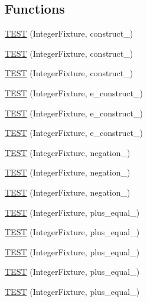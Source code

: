 \subsection*{Functions}
\begin{DoxyCompactItemize}
\item 
\hyperlink{TestInteger_8c_09_09_a675039150248bf0c32e91943652eec94}{T\-E\-S\-T} (Integer\-Fixture, construct\-\_)
\item 
\hyperlink{TestInteger_8c_09_09_ab7b0e23511a3a5075c5fec431d014f40}{T\-E\-S\-T} (Integer\-Fixture, construct\-\_)
\item 
\hyperlink{TestInteger_8c_09_09_afff7d1576c3f9ef137e9a6961ebf690d}{T\-E\-S\-T} (Integer\-Fixture, construct\-\_)
\item 
\hyperlink{TestInteger_8c_09_09_ae066e15674b0c4df3b5b42fcb8f58d06}{T\-E\-S\-T} (Integer\-Fixture, e\-\_\-construct\-\_)
\item 
\hyperlink{TestInteger_8c_09_09_af58d400c030da2027f3db5bfa4d8b690}{T\-E\-S\-T} (Integer\-Fixture, e\-\_\-construct\-\_)
\item 
\hyperlink{TestInteger_8c_09_09_a9ced8436f7a4feeb5305e47b8846e186}{T\-E\-S\-T} (Integer\-Fixture, e\-\_\-construct\-\_)
\item 
\hyperlink{TestInteger_8c_09_09_a87298984a3026a3e01b931e605af6921}{T\-E\-S\-T} (Integer\-Fixture, negation\-\_)
\item 
\hyperlink{TestInteger_8c_09_09_ae71d8b5fd38aaca8f6cbab68089c9ad4}{T\-E\-S\-T} (Integer\-Fixture, negation\-\_)
\item 
\hyperlink{TestInteger_8c_09_09_af175625da1bd939494ca4fd02e788bc1}{T\-E\-S\-T} (Integer\-Fixture, negation\-\_)
\item 
\hyperlink{TestInteger_8c_09_09_abffd71d8b52674efbea0542fb2609aac}{T\-E\-S\-T} (Integer\-Fixture, plus\-\_\-equal\-\_)
\item 
\hyperlink{TestInteger_8c_09_09_a257a9fdd10d78ae76c4de23bf0317448}{T\-E\-S\-T} (Integer\-Fixture, plus\-\_\-equal\-\_)
\item 
\hyperlink{TestInteger_8c_09_09_af66a29ded80d8bd674a74f2061b1d002}{T\-E\-S\-T} (Integer\-Fixture, plus\-\_\-equal\-\_)
\item 
\hyperlink{TestInteger_8c_09_09_ae10dc76d9cc23713b8a665ee42ff9032}{T\-E\-S\-T} (Integer\-Fixture, plus\-\_\-equal\-\_)
\item 
\hyperlink{TestInteger_8c_09_09_a7eea5e03c81d3a0324dd5d3e1efdbc93}{T\-E\-S\-T} (Integer\-Fixture, plus\-\_\-equal\-\_)
\item 

\end{DoxyCompactItemize}
